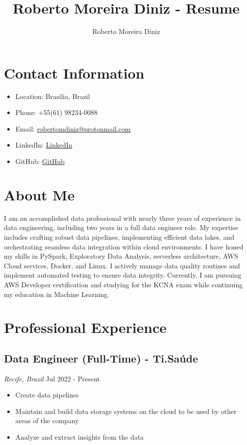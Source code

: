 \documentclass{article}
\title{Roberto Moreira Diniz - Resume}
\author{Roberto Moreira Diniz}
\date{}
\begin{document}
    \maketitle

    \section*{Contact Information}
    \begin{itemize}
        \item Location: Brasilia, Brazil
        \item Phone: +55(61) 98234-0088
        \item Email: \href{mailto:robertomdiniz@protonmail.com}{robertomdiniz@protonmail.com}
        \item LinkedIn: \href{https://www.linkedin.com/in/s33ding/}{LinkedIn}
        \item GitHub: \href{https://github.com/s33ding}{GitHub}
    \end{itemize}

    \section*{About Me}
    I am an accomplished data professional with nearly three years of experience in data engineering, including two years in a full data engineer role. My expertise includes crafting robust data pipelines, implementing efficient data lakes, and orchestrating seamless data integration within cloud environments. I have honed my skills in PySpark, Exploratory Data Analysis, serverless architecture, AWS Cloud services, Docker, and Linux. I actively manage data quality routines and implement automated testing to ensure data integrity. Currently, I am pursuing AWS Developer certification and studying for the KCNA exam while continuing my education in Machine Learning.

    \section*{Professional Experience}
    
        \subsection*{Data Engineer (Full-Time) - Ti.Saúde}
        \textit{Recife, Brazil} \hfill Jul 2022 - Present
        \begin{itemize}
        \item Create data pipelines
\item Maintain and build data storage systems on the cloud to be used by other areas of the company
\item Analyze and extract insights from the data
\end{itemize}
\end{document}
